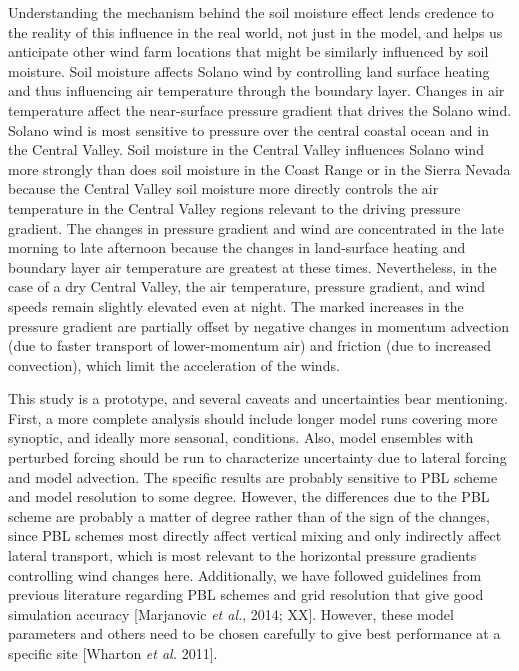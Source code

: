 Understanding the mechanism behind the soil moisture effect lends credence to the reality of this influence in the real world, not just in the model, and helps us anticipate other wind farm locations that might be similarly influenced by soil moisture.  Soil moisture affects Solano wind by controlling land surface heating and thus influencing air temperature through the boundary layer.  Changes in air temperature affect the near-surface pressure gradient that drives the Solano wind.  Solano wind is most sensitive to pressure over the central coastal ocean and in the Central Valley.  Soil moisture in the Central Valley influences Solano wind more strongly than does soil moisture in the Coast Range or in the Sierra Nevada because the Central Valley soil moisture more directly controls the air temperature in the Central Valley regions relevant to the driving pressure gradient.  The changes in pressure gradient and wind are concentrated in the late morning to late afternoon because the changes in land-surface heating and boundary layer air temperature are greatest at these times.  Nevertheless, in the case of a dry Central Valley, the air temperature, pressure gradient, and wind speeds remain slightly elevated even at night.  The marked increases in the pressure gradient are partially offset by negative changes in momentum advection (due to faster transport of lower-momentum air) and friction (due to increased convection), which limit the acceleration of the winds.

This study is a prototype, and several caveats and uncertainties bear mentioning.  First, a more complete analysis should include longer model runs covering more synoptic, and ideally more seasonal, conditions.  Also, model ensembles with perturbed forcing should be run to characterize uncertainty due to lateral forcing and model advection.  The specific results are probably sensitive to PBL scheme and model resolution to some degree.  However, the differences due to the PBL scheme are probably a matter of degree rather than of the sign of the changes, since PBL schemes most directly affect vertical mixing and only indirectly affect lateral transport, which is most relevant to the horizontal pressure gradients controlling wind changes here.  Additionally, we have followed guidelines from previous literature regarding PBL schemes and grid resolution that give good simulation accuracy [Marjanovic \textit{et al.}, 2014; XX].  However, these model parameters and others need to be chosen carefully to give best performance at a specific site [Wharton \textit{et al.} 2011].

